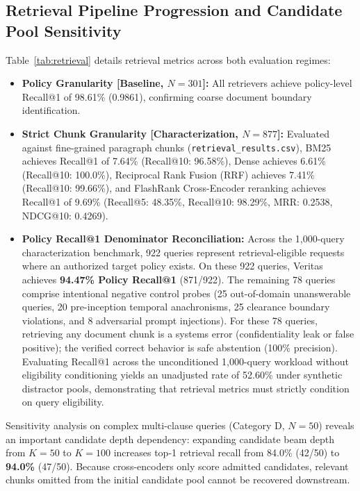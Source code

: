 \documentclass[journal]{IEEEtran}
\newcommand{\sys}{Veritas}
\begin{document}
\subsection{Retrieval Pipeline Progression and Candidate Pool Sensitivity}
Table~\ref{tab:retrieval} details retrieval metrics across both evaluation regimes:
\begin{itemize}\setlength{\itemsep}{0pt}\setlength{\parsep}{0pt}\setlength{\topsep}{0.5pt}
  \item \textbf{Policy Granularity [Baseline, $N=301$]:} All retrievers achieve policy-level Recall@1 of 98.61\% (0.9861), confirming coarse document boundary identification.
  \item \textbf{Strict Chunk Granularity [Characterization, $N=877$]:} Evaluated against fine-grained paragraph chunks (\texttt{retrieval\_results.csv}), BM25 achieves Recall@1 of 7.64\% (Recall@10: 96.58\%), Dense achieves 6.61\% (Recall@10: 100.0\%), Reciprocal Rank Fusion (RRF) achieves 7.41\% (Recall@10: 99.66\%), and FlashRank Cross-Encoder reranking achieves Recall@1 of 9.69\% (Recall@5: 48.35\%, Recall@10: 98.29\%, MRR: 0.2538, NDCG@10: 0.4269).
  \item \textbf{Policy Recall@1 Denominator Reconciliation:} Across the 1,000-query characterization benchmark, 922 queries represent retrieval-eligible requests where an authorized target policy exists. On these 922 queries, \sys{} achieves \textbf{94.47\% Policy Recall@1} (871/922). The remaining 78 queries comprise intentional negative control probes (25 out-of-domain unanswerable queries, 20 pre-inception temporal anachronisms, 25 clearance boundary violations, and 8 adversarial prompt injections). For these 78 queries, retrieving any document chunk is a systems error (confidentiality leak or false positive); the verified correct behavior is safe abstention (100\% precision). Evaluating Recall@1 across the unconditioned 1,000-query workload without eligibility conditioning yields an unadjusted rate of 52.60\% under synthetic distractor pools, demonstrating that retrieval metrics must strictly condition on query eligibility.
\end{itemize}

Sensitivity analysis on complex multi-clause queries (Category D, $N=50$) reveals an important candidate depth dependency: expanding candidate beam depth from $K=50$ to $K=100$ increases top-1 retrieval recall from 84.0\% (42/50) to \textbf{94.0\%} (47/50). Because cross-encoders only score admitted candidates, relevant chunks omitted from the initial candidate pool cannot be recovered downstream.
\end{document}
